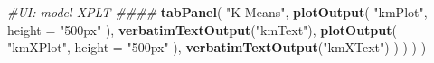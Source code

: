\documentclass[]{article}
\newenvironment{Shaded}{\begin{snugshade}}{\end{snugshade}}
\newcommand{\KeywordTok}[1]{\textcolor[rgb]{0.13,0.29,0.53}{\textbf{#1}}}
\newcommand{\DataTypeTok}[1]{\textcolor[rgb]{0.13,0.29,0.53}{#1}}
\newcommand{\StringTok}[1]{\textcolor[rgb]{0.31,0.60,0.02}{#1}}
\newcommand{\CommentTok}[1]{\textcolor[rgb]{0.56,0.35,0.01}{\textit{#1}}}
\newcommand{\NormalTok}[1]{#1}
\begin{document}
\begin{Shaded}
\begin{Highlighting}[]
            \CommentTok{#UI: model XPLT ####}
            \KeywordTok{tabPanel}\NormalTok{(}
              \StringTok{"K-Means"}\NormalTok{,}
              \KeywordTok{plotOutput}\NormalTok{(}
                \StringTok{"kmPlot"}\NormalTok{,}
                \DataTypeTok{height =} \StringTok{"500px"}
\NormalTok{              ),}
              \KeywordTok{verbatimTextOutput}\NormalTok{(}\StringTok{"kmText"}\NormalTok{),}
              \KeywordTok{plotOutput}\NormalTok{(}
                \StringTok{"kmXPlot"}\NormalTok{,}
                \DataTypeTok{height =} \StringTok{"500px"}
\NormalTok{              ),}
              \KeywordTok{verbatimTextOutput}\NormalTok{(}\StringTok{"kmXText"}\NormalTok{)            }
\NormalTok{              )          }
\NormalTok{          )}
\NormalTok{        )}
\NormalTok{      )}
      

\end{Highlighting}
\end{Shaded}
\end{document}
